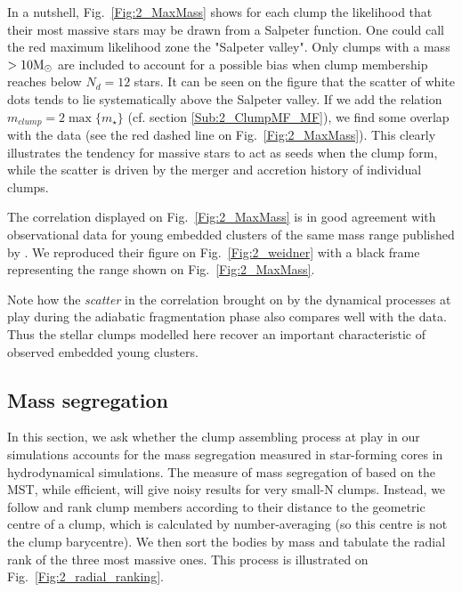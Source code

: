  In a nutshell, Fig.~\ref{Fig:2_MaxMass} shows for each clump the likelihood that their most massive stars may be drawn from a Salpeter function. One could call the red maximum likelihood zone the "Salpeter valley". Only clumps with a mass $> 10 {\textrm{M}_\odot}$ are included to account for a possible bias when clump membership reaches below $N_d =12 $ stars. It can be seen on the figure that the scatter of white dots tends to lie systematically above the Salpeter valley. If we add the  relation $m_{clump} = 2\max\{m_\star\}$ (cf. section \ref{Sub:2_ClumpMF_MF}), we find some overlap with the data (see the red dashed line on Fig.~\ref{Fig:2_MaxMass}). This clearly illustrates the tendency for massive stars to act as seeds when the clump form, while the scatter is driven by the merger and accretion history of individual clumps. 
 
 The correlation displayed on Fig.~\ref{Fig:2_MaxMass} is in good agreement with observational data for young embedded clusters of the same mass range published by \citealt{Weidner2013}. We reproduced their figure on Fig.~\ref{Fig:2_weidner} with a black frame representing the range shown on Fig.~\ref{Fig:2_MaxMass}. 
 
 Note how the {\it scatter} in the correlation brought on by the dynamical processes at play during the adiabatic fragmentation phase also compares well with the data. Thus the stellar clumps modelled here recover an important characteristic of observed embedded young clusters.
 





\subsection{Mass segregation}
\label{Sec:2_ClumpSegregation}

In this section, we ask whether the clump assembling process at play in our simulations accounts for the mass segregation measured  in  star-forming cores in hydrodynamical simulations. The measure of mass segregation of \cite{Olczak2011} based on the MST, while efficient, will give noisy results for very small-N clumps. Instead, we follow \cite{Maschberger2010} and rank clump members according to their distance to the geometric centre of a clump, which is calculated by number-averaging (so this centre is not the clump barycentre). We then sort the bodies by mass and tabulate the radial rank of the three most massive ones. This process is illustrated on Fig.~\ref{Fig:2_radial_ranking}.


